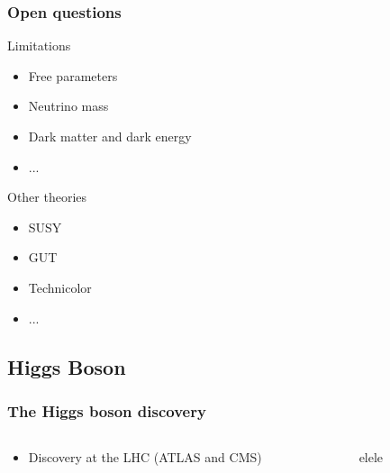 \documentclass{beamer}
\begin{document}
    \begin{frame}
      \frametitle{Open questions}

      \begin{alertblock}{Limitations}
        \begin{itemize}
          \item Free parameters
          \item Neutrino mass
          \item Dark matter and dark energy
          \item ...
        \end{itemize}
      \end{alertblock}
      
      \begin{block}{Other theories}
        \begin{itemize}
          \item SUSY
          \item GUT
          \item Technicolor
          \item ...
        \end{itemize}
      \end{block}
    \end{frame}

    \subsection{Higgs Boson}

    \begin{frame}
      \frametitle{The Higgs boson discovery}

      \begin{columns}[t]
        \begin{column}{5cm}
          \begin{itemize}
            \item Discovery at the LHC (ATLAS and CMS)
          \end{itemize}
        \end{column}
        \begin{column}{5cm}
        elele
        \end{column}
      \end{columns}
    \end{frame}
\end{document}
